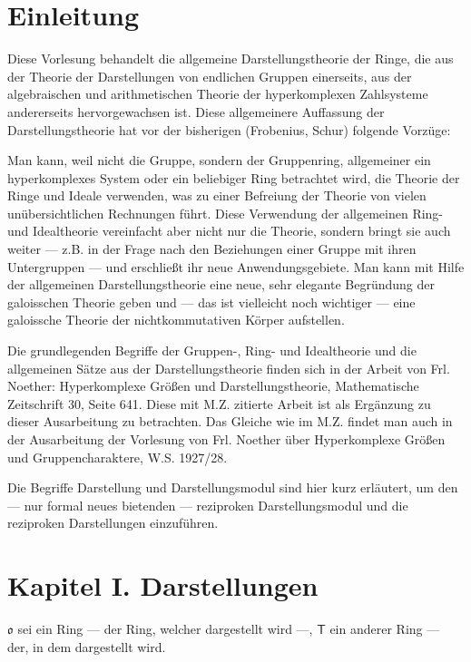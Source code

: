 \section*{Einleitung}\label{einleitung}

Diese Vorlesung behandelt die allgemeine Darstellungstheorie der Ringe, die aus der Theorie der Darstellungen von endlichen Gruppen einerseits, aus der algebraischen und arithmetischen Theorie der hyperkomplexen Zahlsysteme andererseits hervorgewachsen ist. Diese allgemeinere Auffassung der Darstellungstheorie hat vor der bisherigen (Frobenius, Schur) folgende Vorzüge:

Man kann, weil nicht die Gruppe, sondern der Gruppenring, allgemeiner ein hyperkomplexes System oder ein beliebiger Ring betrachtet wird, die Theorie der Ringe und Ideale verwenden, was zu einer Befreiung der Theorie von vielen unübersichtlichen Rechnungen führt. Diese Verwendung der allgemeinen Ring- und Idealtheorie vereinfacht aber nicht nur die Theorie, sondern bringt sie auch weiter --- z.B. in der Frage nach den Beziehungen einer Gruppe mit ihren Untergruppen --- und erschließt ihr neue Anwendungsgebiete. Man kann mit Hilfe der allgemeinen Darstellungstheorie eine neue, sehr elegante Begründung der galoisschen Theorie geben und --- das ist vielleicht noch wichtiger --- eine galoissche Theorie der nichtkommutativen Körper aufstellen.

Die grundlegenden Begriffe der Gruppen-, Ring- und Idealtheorie und die allgemeinen Sätze aus der Darstellungstheorie finden sich in der Arbeit von Frl. Noether: Hyperkomplexe Größen und Darstellungstheorie, Mathematische Zeitschrift 30, Seite 641. Diese mit M.Z. zitierte Arbeit ist als Ergänzung zu dieser Ausarbeitung zu betrachten. Das Gleiche wie im M.Z. findet man auch in der Ausarbeitung der Vorlesung von Frl. Noether über Hyperkomplexe Größen und Gruppencharaktere, W.S. 1927/28.

Die Begriffe Darstellung und Darstellungsmodul sind hier kurz erläutert, um den --- nur formal neues bietenden --- reziproken Darstellungsmodul und die reziproken Darstellungen einzuführen.

\section*{Kapitel I. Darstellungen}\label{kapitel-i.-darstellungen}

\(\mathfrak{o}\) sei ein Ring --- der Ring, welcher dargestellt wird ---, \(\mathsf T\) ein anderer Ring --- der, in dem dargestellt wird.

